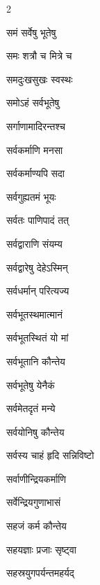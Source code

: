 \begin{multicols}{2}
\begin{indexlist}
\item समं सर्वेषु भूतेषु \dotfill {}
\item समः शत्रौ च मित्रे च \dotfill {}
\item समदुःखसुखः स्वस्थः \dotfill {}
\item समोऽहं सर्वभूतेषु \dotfill {}
\item सर्गाणामादिरन्तश्च \dotfill {}
\item सर्वकर्माणि मनसा \dotfill {}
\item सर्वकर्माण्यपि सदा \dotfill {}
\item सर्वगुह्यतमं भूयः \dotfill {}
\item सर्वतः पाणिपादं तत् \dotfill {}
\item सर्वद्वाराणि संयम्य \dotfill {}
\item सर्वद्वारेषु देहेऽस्मिन् \dotfill {}
\item सर्वधर्मान् परित्यज्य \dotfill {}
\item सर्वभूतस्थमात्मानं \dotfill {}
\item सर्वभूतस्थितं यो मां \dotfill {}
\item सर्वभूतानि कौन्तेय \dotfill {}
\item सर्वभूतेषु येनैकं \dotfill {}
\item सर्वमेतदृतं मन्ये \dotfill {}
\item सर्वयोनिषु कौन्तेय \dotfill {}
\item सर्वस्य चाहं हृदि सन्निविष्टो \dotfill {}
\item सर्वाणीन्द्रियकर्माणि \dotfill {}
\item सर्वेन्द्रियगुणाभासं \dotfill {}
\item सहजं कर्म कौन्तेय \dotfill {}
\item सहयज्ञाः प्रजाः सृष्ट्वा \dotfill {}
\item सहस्रयुगपर्यन्तमहर्यद् \dotfill {}

\end{indexlist}
\end{multicols}
